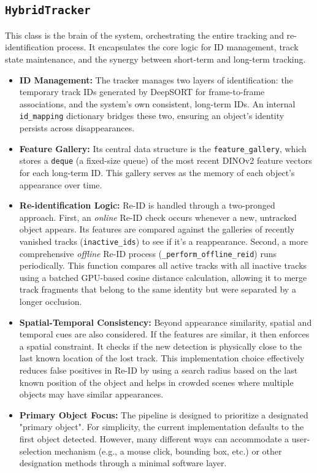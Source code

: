 \documentclass[conference]{IEEEtran}
\begin{document}
\subsection{\texttt{HybridTracker}}
This class is the brain of the system, orchestrating the entire tracking and re-identification process. It encapsulates the core logic for ID management, track state maintenance, and the synergy between short-term and long-term tracking.
\begin{itemize}
    \item \textbf{ID Management:} The tracker manages two layers of identification: the temporary track IDs generated by DeepSORT for frame-to-frame associations, and the system's own consistent, long-term IDs. An internal \texttt{id\_mapping} dictionary bridges these two, ensuring an object's identity persists across disappearances.
    \item \textbf{Feature Gallery:} Its central data structure is the \texttt{feature\_gallery}, which stores a \texttt{deque} (a fixed-size queue) of the most recent DINOv2 feature vectors for each long-term ID. This gallery serves as the memory of each object's appearance over time.
    \item \textbf{Re-identification Logic:} Re-ID is handled through a two-pronged approach. First, an \textit{online} Re-ID check occurs whenever a new, untracked object appears. Its features are compared against the galleries of recently vanished tracks (\texttt{inactive\_ids}) to see if it's a reappearance. Second, a more comprehensive \textit{offline} Re-ID process (\texttt{\_perform\_offline\_reid}) runs periodically. This function compares all active tracks with all inactive tracks using a batched GPU-based cosine distance calculation, allowing it to merge track fragments that belong to the same identity but were separated by a longer occlusion.
    \item \textbf{Spatial-Temporal Consistency:} Beyond appearance similarity, spatial and temporal cues are also considered. If the features are similar, it then enforces a spatial constraint. It checks if the new detection is physically close to the last known location of the lost track. This implementation choice effectively reduces false positives in Re-ID by using a search radius based on the last known position of the object and helps in crowded scenes where multiple objects may have similar appearances.
    \item \textbf{Primary Object Focus:} The pipeline is designed to prioritize a designated "primary object". For simplicity, the current implementation defaults to the first object detected. However, many different ways can accommodate a user-selection mechanism (e.g., a mouse click, bounding box, etc.) or other designation methods through a minimal software layer.
\end{itemize}
\end{document}
